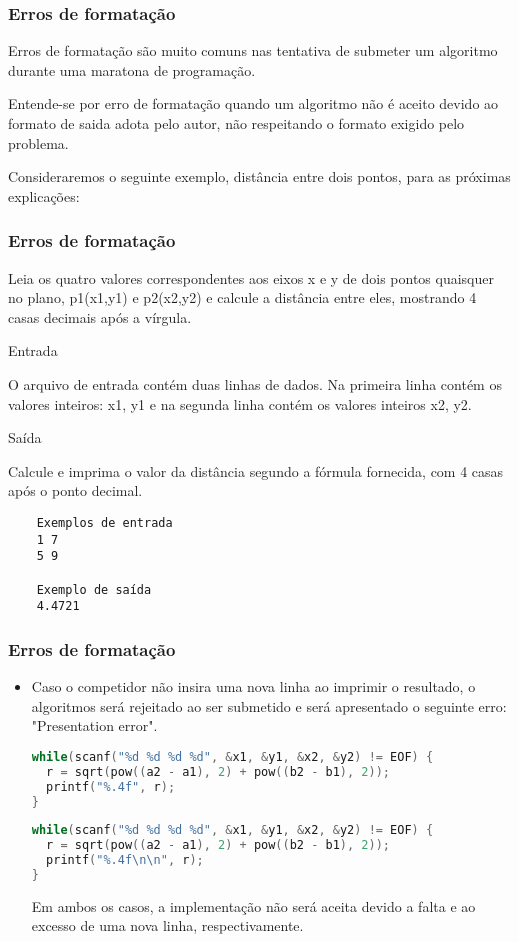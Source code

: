 \begin{frame}
 \frametitle{Erros de formatação}
 Erros de formatação são muito comuns nas tentativa de submeter um algoritmo durante uma maratona de programação.
 
 Entende-se por erro de formatação quando um algoritmo não é aceito devido ao formato de saida adota pelo autor, não respeitando o formato exigido pelo problema.
 
 Consideraremos o seguinte exemplo, distância entre dois pontos, para as próximas explicações:
\end{frame}

\begin{frame} [fragile]
\frametitle{Erros de formatação}
\small Leia os quatro valores correspondentes aos eixos x e y de dois pontos quaisquer no plano, p1(x1,y1) e p2(x2,y2) e calcule a distância entre eles, mostrando 4 casas decimais após a vírgula.
  \begin{center}
Entrada
  \end{center}
\small O arquivo de entrada contém duas linhas de dados. Na primeira linha contém os valores inteiros: x1, y1 e na segunda linha contém os valores inteiros x2, y2.
  \begin{center}
Saída
  \end{center}
Calcule e imprima o valor da distância segundo a fórmula fornecida, com 4 casas após o ponto decimal.
  \begin{lstlisting}
    Exemplos de entrada
    1 7
    5 9

    Exemplo de saída
    4.4721
  \end{lstlisting}
\end{frame}

\begin{frame} [fragile]
 \frametitle{Erros de formatação}
 \begin{itemize}
  \item Caso o competidor não insira uma nova linha ao imprimir o resultado, o algoritmos será rejeitado ao ser submetido e será apresentado o seguinte erro: "Presentation error".
  \begin{lstlisting}[language=c]
while(scanf("%d %d %d %d", &x1, &y1, &x2, &y2) != EOF) {
  r = sqrt(pow((a2 - a1), 2) + pow((b2 - b1), 2));
  printf("%.4f", r);
}  
  \end{lstlisting}
  \begin{lstlisting}[language=c]
while(scanf("%d %d %d %d", &x1, &y1, &x2, &y2) != EOF) {
  r = sqrt(pow((a2 - a1), 2) + pow((b2 - b1), 2));
  printf("%.4f\n\n", r);
}  
  \end{lstlisting}
  Em ambos os casos, a implementação não será aceita devido a falta e ao excesso de uma nova linha, respectivamente.
 \end{itemize}
\end{frame}


